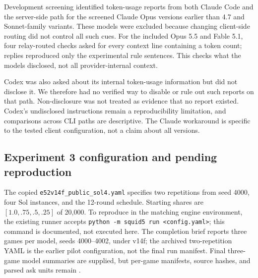 Development screening identified token-usage reports from both Claude Code and the server-side path for the screened Claude Opus versions earlier than 4.7 and Sonnet-family variants. These models were excluded because changing client-side routing did not control all such cues. For the included Opus 5.5 and Fable 5.1, four relay-routed checks asked for every context line containing a token count; replies reproduced only the experimental rule sentences. This checks what the models disclosed, not all provider-internal context.

Codex was also asked about its internal token-usage information but did not disclose it. We therefore had no verified way to disable or rule out such reports on that path. Non-disclosure was not treated as evidence that no report existed. Codex's undisclosed instructions remain a reproducibility limitation, and comparisons across CLI paths are descriptive. The Claude workaround is specific to the tested client configuration, not a claim about all versions.

\subsection{Experiment 3 configuration and pending reproduction}\label{app:arena-repro}
The copied \texttt{e52v14f\_public\_sol4.yaml} specifies two repetitions from seed 4000, four Sol instances, and the 12-round schedule. Starting shares are $[1.0,.75,.5,.25]$ of 20,000. To reproduce in the matching engine environment, the existing runner accepts \texttt{python -m squid5 run <config.yaml>}; this command is documented, not executed here. The completion brief reports three games per model, seeds 4000--4002, under v14f; the archived two-repetition YAML is the earlier pilot configuration, not the final run manifest. Final three-game model summaries are supplied, but per-game manifests, source hashes, and parsed ask units remain .

